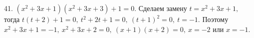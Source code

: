 41. $(x^2+3x+1)(x^2+3x+3)+1=0.$ Сделаем замену $t=x^2+3x+1,$ тогда $t(t+2)+1=0,\ t^2+2t+1=0,\ (t+1)^2=0,\ t=-1.$ Поэтому $x^2+3x+1=-1,\
x^2+3x+2=0,\ (x+1)(x+2)=0,\ x=-2$ или $x=-1.$\\
